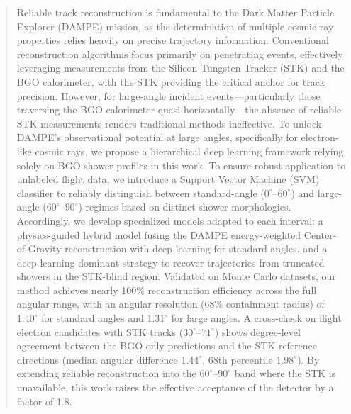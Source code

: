 \documentclass[preprint,12pt]{elsarticle}
\begin{document}
\begin{frontmatter}



\begin{abstract}
Reliable track reconstruction is fundamental to the Dark Matter Particle Explorer (DAMPE) mission, as the determination of multiple cosmic ray properties relies heavily on precise trajectory information. Conventional reconstruction algorithms focus primarily on penetrating events, effectively leveraging measurements from the Silicon-Tungsten Tracker (STK) and the BGO calorimeter, with the STK providing the critical anchor for track precision. However, for large-angle incident events---particularly those traversing the BGO calorimeter quasi-horizontally---the absence of reliable STK measurements renders traditional methods ineffective. To unlock DAMPE's observational potential at large angles, specifically for electron-like cosmic rays, we propose a hierarchical deep learning framework relying solely on BGO shower profiles in this work. To ensure robust application to unlabeled flight data, we introduce a Support Vector Machine (SVM) classifier to reliably distinguish between standard-angle ($0^{\circ}$--$60^{\circ}$) and large-angle ($60^{\circ}$--$90^{\circ}$) regimes based on distinct shower morphologies. Accordingly, we develop specialized models adapted to each interval: a physics-guided hybrid model fusing the DAMPE energy-weighted Center-of-Gravity reconstruction with deep learning for standard angles, and a deep-learning-dominant strategy to recover trajectories from truncated showers in the STK-blind region. Validated on Monte Carlo datasets, our method achieves nearly 100\% reconstruction efficiency across the full angular range, with an angular resolution (68\% containment radius) of $1.40^{\circ}$ for standard angles and $1.31^{\circ}$ for large angles. A cross-check on flight electron candidates with STK tracks ($30^{\circ}$--$71^{\circ}$) shows degree-level agreement between the BGO-only predictions and the STK reference directions (median angular difference $1.44^{\circ}$, 68th percentile $1.98^{\circ}$). By extending reliable reconstruction into the $60^{\circ}$--$90^{\circ}$ band where the STK is unavailable, this work raises the effective acceptance of the detector by a factor of 1.8.
\end{abstract}



\end{frontmatter}
\end{document}
